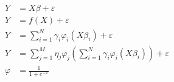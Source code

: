 \documentclass{jsarticle}
\begin{document}
\begin{align}
Y & = X\beta + \varepsilon \\
Y & = f(X) + \varepsilon \\
Y & = \sum_{i=1}^{N}\gamma_i\varphi_i(X\beta_i)  + \varepsilon \\
Y & = \sum_{j=1}^{M}\eta_j\varphi_j(\sum_{i=1}^{N}\gamma_i\varphi_i(X\beta_i))  + \varepsilon \\
\varphi &= \frac{1}{1 + e^{-x}}
\end{align}
\end{document}
